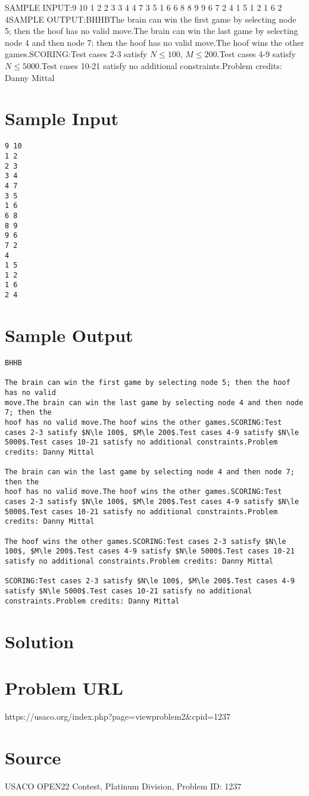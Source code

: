 \documentclass[12pt]{article}
\begin{document}
SAMPLE INPUT:9 10
1 2
2 3
3 4
4 7
3 5
1 6
6 8
8 9
9 6
7 2
4
1 5
1 2
1 6
2 4SAMPLE OUTPUT:BHHBThe brain can win the first game by selecting node 5; then the hoof has no valid
move.The brain can win the last game by selecting node 4 and then node 7; then the
hoof has no valid move.The hoof wins the other games.SCORING:Test cases 2-3 satisfy $N\le 100$, $M\le 200$.Test cases 4-9 satisfy $N\le 5000$.Test cases 10-21 satisfy no additional constraints.Problem credits: Danny Mittal

\section*{Sample Input}
\begin{verbatim}
9 10
1 2
2 3
3 4
4 7
3 5
1 6
6 8
8 9
9 6
7 2
4
1 5
1 2
1 6
2 4
\end{verbatim}

\section*{Sample Output}
\begin{verbatim}
BHHB

The brain can win the first game by selecting node 5; then the hoof has no valid
move.The brain can win the last game by selecting node 4 and then node 7; then the
hoof has no valid move.The hoof wins the other games.SCORING:Test cases 2-3 satisfy $N\le 100$, $M\le 200$.Test cases 4-9 satisfy $N\le 5000$.Test cases 10-21 satisfy no additional constraints.Problem credits: Danny Mittal

The brain can win the last game by selecting node 4 and then node 7; then the
hoof has no valid move.The hoof wins the other games.SCORING:Test cases 2-3 satisfy $N\le 100$, $M\le 200$.Test cases 4-9 satisfy $N\le 5000$.Test cases 10-21 satisfy no additional constraints.Problem credits: Danny Mittal

The hoof wins the other games.SCORING:Test cases 2-3 satisfy $N\le 100$, $M\le 200$.Test cases 4-9 satisfy $N\le 5000$.Test cases 10-21 satisfy no additional constraints.Problem credits: Danny Mittal

SCORING:Test cases 2-3 satisfy $N\le 100$, $M\le 200$.Test cases 4-9 satisfy $N\le 5000$.Test cases 10-21 satisfy no additional constraints.Problem credits: Danny Mittal
\end{verbatim}

\section*{Solution}


\section*{Problem URL}
https://usaco.org/index.php?page=viewproblem2&cpid=1237

\section*{Source}
USACO OPEN22 Contest, Platinum Division, Problem ID: 1237
\end{document}
